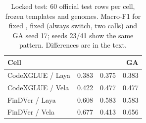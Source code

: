 \begin{table}[t]
\centering
\scriptsize
\caption{Locked test: 60 official test rows per cell, frozen templates and
genomes. Macro-F1 for fixed \noul{}, fixed \choice{} (always switch, two calls)
and GA seed 17; seeds 23/41 show the same pattern. Differences are in the text.}
\label{tab:locked}
\begin{tabular}{@{}lrrr@{}}
\toprule
Cell & \noul{} & \choice{} & GA \\
\midrule
CodeXGLUE / Laya & 0.383 & 0.375 & 0.383 \\
CodeXGLUE / Vela & 0.422 & 0.477 & 0.477 \\
FinDVer / Laya & 0.608 & 0.583 & 0.583 \\
FinDVer / Vela & 0.677 & 0.413 & 0.656 \\
\bottomrule
\end{tabular}
\end{table}
